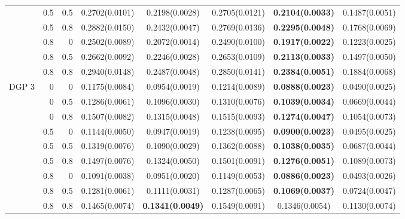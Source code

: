 \begin{table}[!ht]
\begin{adjustbox}{max width=\linewidth}
\begin{tabular}{@{}lrrccccc@{}}
 & 0.5 & 0.5 & 0.2702(0.0101) & 0.2198(0.0028) & 0.2705(0.0121) & \textbf{0.2104(0.0033)} & 0.1487(0.0051)\\
 & 0.5 & 0.8 & 0.2882(0.0150) & 0.2432(0.0047) & 0.2769(0.0136) & \textbf{0.2295(0.0048)} & 0.1768(0.0069)\\
 & 0.8 & 0 & 0.2502(0.0089) & 0.2072(0.0014) & 0.2490(0.0100) & \textbf{0.1917(0.0022)} & 0.1223(0.0025)\\
 & 0.8 & 0.5 & 0.2662(0.0092) & 0.2246(0.0028) & 0.2653(0.0109) & \textbf{0.2113(0.0033)} & 0.1497(0.0050)\\
 & 0.8 & 0.8 & 0.2940(0.0148) & 0.2487(0.0048) & 0.2850(0.0141) & \textbf{0.2384(0.0051)} & 0.1884(0.0068)\\
\midrule
\multirow{9}{*}{DGP 3} & 0 & 0 & 0.1175(0.0084) & 0.0954(0.0019) & 0.1214(0.0089) & \textbf{0.0888(0.0023)} & 0.0490(0.0025)\\
 & 0 & 0.5 & 0.1286(0.0061) & 0.1096(0.0030) & 0.1310(0.0076) & \textbf{0.1039(0.0034)} & 0.0669(0.0044)\\
 & 0 & 0.8 & 0.1507(0.0082) & 0.1315(0.0048) & 0.1515(0.0093) & \textbf{0.1274(0.0047)} & 0.1054(0.0073)\\
 & 0.5 & 0 & 0.1144(0.0050) & 0.0947(0.0019) & 0.1238(0.0095) & \textbf{0.0900(0.0023)} & 0.0495(0.0025)\\
 & 0.5 & 0.5 & 0.1319(0.0076) & 0.1090(0.0029) & 0.1362(0.0088) & \textbf{0.1038(0.0035)} & 0.0687(0.0044)\\
 & 0.5 & 0.8 & 0.1497(0.0076) & 0.1324(0.0050) & 0.1501(0.0091) & \textbf{0.1276(0.0051)} & 0.1089(0.0073)\\
 & 0.8 & 0 & 0.1091(0.0038) & 0.0951(0.0020) & 0.1149(0.0053) & \textbf{0.0886(0.0023)} & 0.0493(0.0026)\\
 & 0.8 & 0.5 & 0.1281(0.0061) & 0.1111(0.0031) & 0.1287(0.0065) & \textbf{0.1069(0.0037)} & 0.0724(0.0047)\\
 & 0.8 & 0.8 & 0.1465(0.0074) & \textbf{0.1341(0.0049)} & 0.1549(0.0091) & 0.1346(0.0054) & 0.1130(0.0074)\\
\bottomrule
\end{tabular}
\end{adjustbox}
\end{table}

